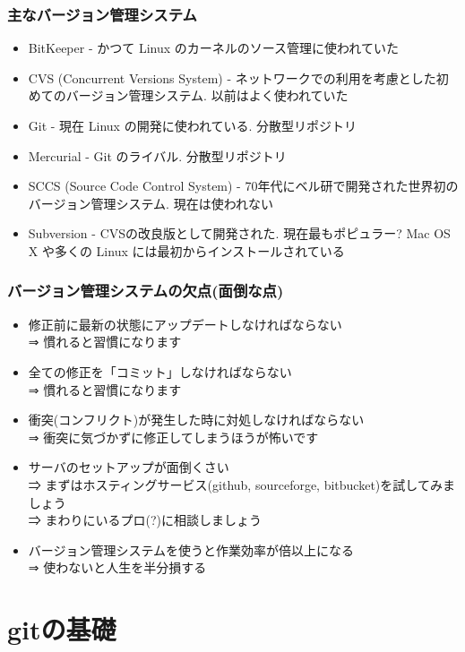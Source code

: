 \begin{frame}
  \frametitle{主なバージョン管理システム}
  \begin{itemize}
  \item BitKeeper - かつて Linux のカーネルのソース管理に使われていた
  \item CVS (Concurrent Versions System) - ネットワークでの利用を考慮とした初めてのバージョン管理システム. 以前はよく使われていた
  \item Git - 現在 Linux の開発に使われている. 分散型リポジトリ
  \item Mercurial - Git のライバル. 分散型リポジトリ
  \item SCCS (Source Code Control System) - 70年代にベル研で開発された世界初のバージョン管理システム. 現在は使われない
  \item Subversion - CVSの改良版として開発された. 現在最もポピュラー? Mac OS X や多くの Linux には最初からインストールされている
  \end{itemize}
\end{frame}

\begin{frame}
  \frametitle{バージョン管理システムの欠点(面倒な点)}
  \begin{itemize}
  \item 修正前に最新の状態にアップデートしなければならない \\
   ⇒ 慣れると習慣になります
  \item 全ての修正を「コミット」しなければならない \\
    ⇒ 慣れると習慣になります
  \item 衝突(コンフリクト)が発生した時に対処しなければならない \\
    ⇒ 衝突に気づかずに修正してしまうほうが怖いです
  \item サーバのセットアップが面倒くさい \\
    ⇒ まずはホスティングサービス(github, sourceforge, bitbucket)を試してみましょう \\
    ⇒ まわりにいるプロ(?)に相談しましょう \\[.5em]
  \item バージョン管理システムを使うと作業効率が倍以上になる \\
    ⇒ {\color{red} 使わないと人生を半分損する}
  \end{itemize}
\end{frame}

\section{gitの基礎}

